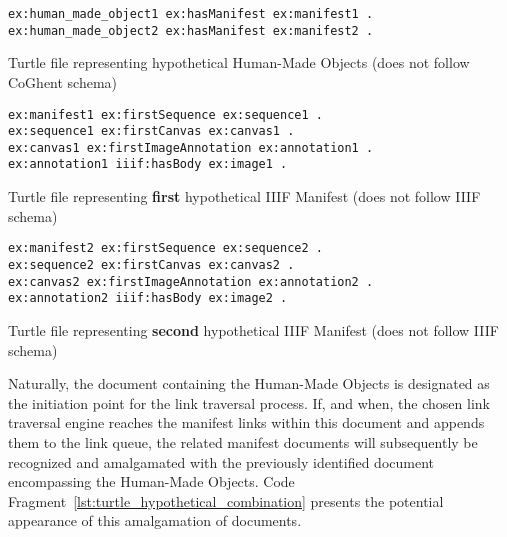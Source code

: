 \begin{listing}[htbp]
    \begin{verbatim}
ex:human_made_object1 ex:hasManifest ex:manifest1 .
ex:human_made_object2 ex:hasManifest ex:manifest2 .
    \end{verbatim}
    \caption{Turtle file representing hypothetical Human-Made Objects (does not follow CoGhent schema)}
    \label{lst:turtle_hypothetical_hmo}
\end{listing}

\begin{listing}[htbp]
    \begin{verbatim}
ex:manifest1 ex:firstSequence ex:sequence1 .
ex:sequence1 ex:firstCanvas ex:canvas1 .
ex:canvas1 ex:firstImageAnnotation ex:annotation1 .
ex:annotation1 iiif:hasBody ex:image1 .
    \end{verbatim}
    \caption{Turtle file representing \textbf{first} hypothetical IIIF Manifest (does not follow IIIF schema)}
    \label{lst:turtle_hypothetical_first_manifest}
\end{listing}

\begin{listing}[htbp]
    \begin{verbatim}
ex:manifest2 ex:firstSequence ex:sequence2 .
ex:sequence2 ex:firstCanvas ex:canvas2 .
ex:canvas2 ex:firstImageAnnotation ex:annotation2 .
ex:annotation2 iiif:hasBody ex:image2 .
    \end{verbatim}
    \caption{Turtle file representing \textbf{second} hypothetical IIIF Manifest (does not follow IIIF schema)}
    \label{lst:turtle_hypothetical_second_manifest}
\end{listing}

Naturally, the document containing the Human-Made Objects is designated as the initiation point for the link traversal process. If, and when, the chosen link traversal engine reaches the manifest links within this document and appends them to the link queue, the related manifest documents will subsequently be recognized and amalgamated with the previously identified document encompassing the Human-Made Objects. Code Fragment~\ref{lst:turtle_hypothetical_combination} presents the potential appearance of this amalgamation of documents.

